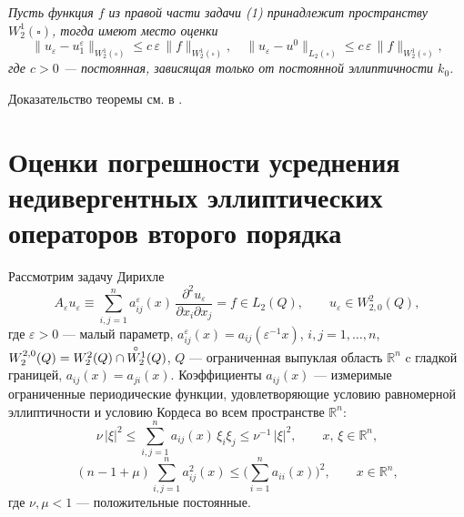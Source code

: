 \smallskip

\begin{theorem}
\textit{Пусть функция  $f$ из  правой части задачи \textrm{(1)} принадлежит пространству $W^1_2(\square)$,  тогда имеют место оценки
$$
\|u_\varepsilon-u_1^\varepsilon\|_{W^1_2(\square)}\leqslant c\,\varepsilon\,\|f\|_{W^1_2(\square)},\quad
\|u_\varepsilon-u^0\|_{L_2(\square)}\leqslant c\,\varepsilon\,\|f\|_{W^1_2(\square)},
$$
где $c>0$ --- постоянная, зависящая только от постоянной эллиптичности $k_0$.}
\end{theorem}

Доказательство теоремы см. в \cite{smm_SS}.









\chapter{Оценки погрешности усреднения недивергентных
эллиптических операторов второго порядка}


Рассмотрим задачу Дирихле
\begin{equation}\label{smm3_1}
  A_\varepsilon u_\varepsilon\equiv\sum\limits_{i,j=1}^na_{ij}^\varepsilon(x)\,
\frac{\partial^2u_\varepsilon}{\partial x_i\partial x_j}=f\in
L_2(Q), \qquad
   u_\varepsilon\in W_{2,0}^2(Q),
\end{equation}
где $\varepsilon>0$ --- малый параметр,  $a_{ij}^\varepsilon(x)=a_{ij}
(\varepsilon^{-1}x)$,
$i,j=1,\dots,n$, $W_2^{2,0}(Q)=W_2^2(Q)\cap \overset{\!\circ}{W_2^{\smash[t]1}}(Q)$,
$Q$ --- ограниченная выпуклая область
$\mathbb{R}^n$ c гладкой границей, $a_{ij}(x)=a_{ji}(x)$. Коэффициенты
 $a_{ij}(x)$  --- измеримые ограниченные
периодические
функции, удовлетворяющие условию равномерной эллиптичности
 и условию Кордеса во всем пространстве $\mathbb{R}^n$:
 \begin{equation}\label{smm3_2}
\nu\,|\xi|^2\leq\sum_{i,j=1}^na_{ij}(x)\,\xi_i\xi_j\leq\nu^{-1}\,|\xi|^2,
\qquad x,\,\xi\in\mathbb{R}^n,
\end{equation}
\vspace{-3mm}
\begin{equation}\label{smm3_3}
(n-1+\mu)\sum_{i,j=1}^na_{ij}^2(x)\leq\Big(\sum_{i=1}^na_{ii}(x)\Big)^2,
\qquad x\in \mathbb{R}^n,
\end{equation}
где $\nu, \mu<1$ --- положительные постоянные.

